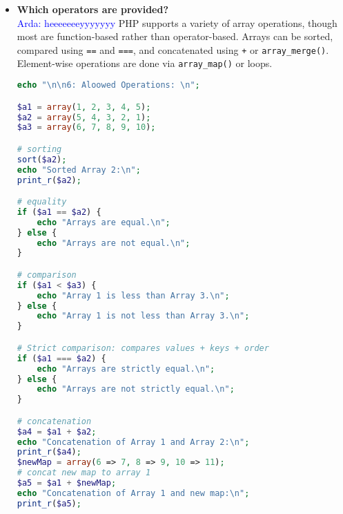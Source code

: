 \documentclass{article}
\newcommand{\arda}[1]{\textcolor{blue}{Arda: #1}}
\begin{document}
\begin{itemize}
\begin{lstlisting}[language=PHP]
$slice = array_slice($arr1, 1, 2); // (begin, length)
echo "Slice from index 1, length 2:\n";
print_r($slice);

$slice = array_slice($arr1, 1); // (begin)
echo "Slice from index 1 to end:\n";
print_r($slice);

$slice = array_slice($arr1, 0, 2);
echo "Slice from beginning, length 2:\n";
print_r($slice);

$slice = array_slice($arr1, -4, 2); # start from -4th index, length = 2
echo "Slice from -4:\n";
print_r($slice);
\end{lstlisting}
\textbf{Printed Output:}
\begin{verbatim}
5: Array Slice: 
Slice from index 1, length 2:
Array
(
    [0] => 2
    [1] => 3
)
Slice from index 1 to end:
Array
(
    [0] => 2
    [1] => 3
    [2] => 4
    [3] => 5
    [4] => 6
    [5] => 7
    [6] => 8
    [7] => 9
    [8] => 10
)
Slice from beginning, length 2:
Array
(
    [0] => 1
    [1] => 2
)
Slice from -4:
Array
(
    [0] => 7
    [1] => 8
)
\end{verbatim}




\item \textbf{Which operators are provided?} \\
\arda{heeeeeeeyyyyyyy}
PHP supports a variety of array operations, though most are function-based rather than operator-based. Arrays can be sorted, compared using \texttt{==} and \texttt{===}, and concatenated using \texttt{+} or \texttt{array\_merge()}. Element-wise operations are done via \texttt{array\_map()} or loops.
\begin{lstlisting}[language=PHP]
echo "\n\n6: Aloowed Operations: \n";

$a1 = array(1, 2, 3, 4, 5);
$a2 = array(5, 4, 3, 2, 1);
$a3 = array(6, 7, 8, 9, 10);

# sorting
sort($a2);
echo "Sorted Array 2:\n";
print_r($a2);

# equality
if ($a1 == $a2) {
    echo "Arrays are equal.\n";
} else {
    echo "Arrays are not equal.\n";
}

# comparison
if ($a1 < $a3) {
    echo "Array 1 is less than Array 3.\n";
} else {
    echo "Array 1 is not less than Array 3.\n";
}

# Strict comparison: compares values + keys + order
if ($a1 === $a2) {
    echo "Arrays are strictly equal.\n";
} else {
    echo "Arrays are not strictly equal.\n";
}

# concatenation
$a4 = $a1 + $a2;
echo "Concatenation of Array 1 and Array 2:\n";
print_r($a4);
$newMap = array(6 => 7, 8 => 9, 10 => 11);
# concat new map to array 1
$a5 = $a1 + $newMap;
echo "Concatenation of Array 1 and new map:\n";
print_r($a5);


\end{lstlisting}
\end{itemize}
\end{document}
